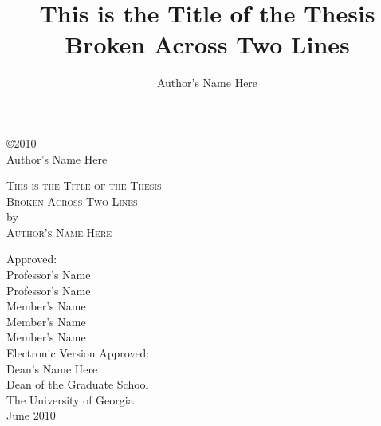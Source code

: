 \documentclass[12pt]{report}
\begin{document}
\newpage
\thispagestyle{empty}
\vspace*{5.5in}
\begin{center}
\copyright 2010 \\
Author's Name Here
\end{center}

\newpage
\thispagestyle{empty}
\vspace*{18pt}
\begin{center}
\textsc{This is the Title of the Thesis\\Broken Across Two Lines}\\[18pt]
by\\[18pt]
\textsc{Author's Name Here}
\end{center}
\vfill
\begin{flushleft}\singlespacing
\hskip 200pt {Approved:}\\
\vskip 12pt
\hspace*{200pt}Professor's Name\\
\hspace*{200pt}\makebox[100pt][l]{~                }Professor's Name\\
\vskip 12pt
\hspace*{200pt}Member's Name\\
\hspace*{200pt}\makebox[100pt][l]{~                }Member's Name\\
\hspace*{200pt}\makebox[100pt][l]{~                }Member's Name\\
\vfill
Electronic Version Approved:\\[12pt]
Dean's Name Here\\
Dean of the Graduate School\\
The University of Georgia\\
June 2010
\end{flushleft}


\title{\bf This is the Title of the Thesis\\Broken Across Two Lines}
\author{Author's Name Here}
\maketitle 
\end{document}
